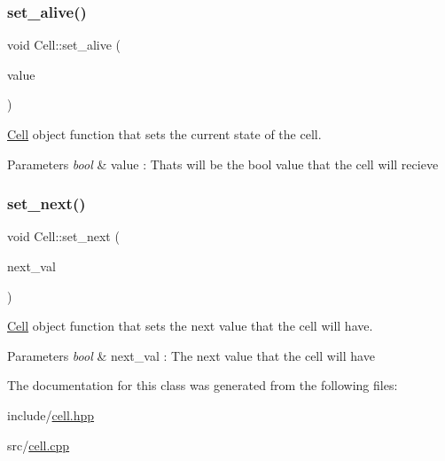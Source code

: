 \subsubsection{\texorpdfstring{set\+\_\+alive()}{set\_alive()}}
{\footnotesize\ttfamily void Cell\+::set\+\_\+alive (\begin{DoxyParamCaption}\item[{bool}]{value }\end{DoxyParamCaption})}



\mbox{\hyperlink{class_cell}{Cell}} object function that sets the current state of the cell. 


\begin{DoxyParams}{Parameters}
{\em bool} & value \+: That\textquotesingle{}s will be the bool value that the cell will recieve \\
\hline
\end{DoxyParams}
\mbox{\label{class_cell_a25ca55e576079dda0ada13d21c817030}} 
\subsubsection{\texorpdfstring{set\+\_\+next()}{set\_next()}}
{\footnotesize\ttfamily void Cell\+::set\+\_\+next (\begin{DoxyParamCaption}\item[{bool}]{next\+\_\+val }\end{DoxyParamCaption})}



\mbox{\hyperlink{class_cell}{Cell}} object function that sets the next value that the cell will have. 


\begin{DoxyParams}{Parameters}
{\em bool} & next\+\_\+val \+: The next value that the cell will have \\
\hline
\end{DoxyParams}


The documentation for this class was generated from the following files\+:\begin{DoxyCompactItemize}
\item 
include/\mbox{\hyperlink{cell_8hpp}{cell.\+hpp}}\item 
src/\mbox{\hyperlink{cell_8cpp}{cell.\+cpp}}\end{DoxyCompactItemize}
